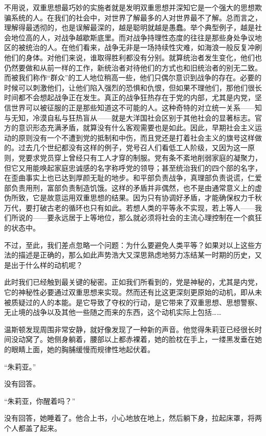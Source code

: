 不用说，双重思想最巧妙的实施者就是发明双重思想并深知它是一个强大的思想欺骗系统的人。在我们的社会中，对世界了解最多的人对世界最不了解。总而言之，理解得最透彻的，也是误解最深的，越是聪明就越是愚蠢。举个典型例子，越是社会地位高的人，对战争越歇斯底里。而对战争持理性态度的往往是那些身处争议地区的被统治的人。在他们看来，战争无非是一场持续性灾难，如海浪一般反复冲刷他们的身体。对他们来说，谁取得胜利都没有分别。就算统治者发生变化，他们也仍然要做和从前一样的工作，新统治者对待他们的方式也和旧统治者的别无二致。而被我们称作``群众''的工人地位稍高一些，他们只偶尔意识到战争的存在。必要的时候可以刺激他们，让他们陷入强烈的恐惧和仇恨，但如果不理他们，那他们很长时间都不会想起战争正在发生。真正的战争狂热存在于党的内部，尤其是内党，坚信世界可以被征服的正是那些知道这不可能的人。这种奇特的对立统一关系——知与无知，冷漠自私与狂热盲从——就是大洋国社会区别于其他社会的显著标志。官方的意识形态充满矛盾，就算没有什么客观需要也是如此。因此，早期社会主义运动的原则没有一个不遭到党的抵制和中伤，而且党还是打着社会主义的旗号这样做的。过去几个世纪都没有这样的例子，党号召人们看低工人阶级，又因为这一原则，党要求党员穿上曾经只有工人才穿的制服。党有条不紊地削弱家庭的凝聚力，但它又用能唤起家庭忠诚感的名字称呼党的领导；甚至统治我们的四个部的名字，在歪曲事实上也已达到厚颜无耻的地步。和平部负责战争，真理部负责说谎，仁爱部负责用刑，富部负责制造饥饿。这样的矛盾并非偶然，也不是由通常意义上的虚伪所致，它是故意运用双重思想的结果。因为只有协调好矛盾，才能确保权力千秋万代，要打破古老的循环也只有如此。若想人类的平等永不实现，若上等人——我们所说的——要永远居于上等地位，那么就必须将社会的主流心理控制在一个疯狂的状态中。

不过，至此，我们差点忽略一个问题：为什么要避免人类平等？如果对以上这些方法的描述是正确的，那么如此声势浩大又深思熟虑地努力冻结某一时期的历史，又是出于什么样的动机呢？

此时我们已经触到最关键的秘密。正如我们所看到的，党是神秘的，尤其是内党，它的神秘性必要通过双重思想来实现。然而还有比这更深刻更原始的动机，即从未被质疑过的人的本能。是它导致了夺权的行动，是它带来了双重思想、思想警察、无止境的战争以及其他一些随之而来的东西，这个动机实际上包括\ldots\ldots{}

温斯顿发现周围非常安静，就好像发现了一种新的声音。他觉得朱莉亚已经很长时间没动窝了。她侧身躺着，腰部以上都赤裸着，她的脸枕在手上，一缕黑发垂在她的眼睛上面，她的胸脯缓慢而规律性地起伏着。

``朱莉亚。''

没有回答。

``朱莉亚，你醒着吗？''

没有回答，她睡着了。他合上书，小心地放在地上，然后躺下身，拉起床罩，将两个人都盖了起来。

